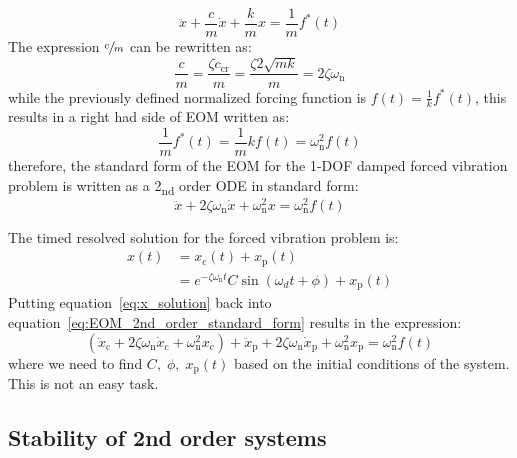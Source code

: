 \documentclass[12pt,letter]{article}
\numberwithin{ex}{section} %
\numberwithin{re}{section} %
\numberwithin{equation}{section}	%
\begin{document}
\begin{equation}
\ddot{x} + \frac{c}{m}\dot{x} + \frac{k}{m}x = \frac{1}{m}f^*(t)
\end{equation}
The expression $\sfrac{c}{m}$ can be rewritten as:
\begin{equation}
\frac{c}{m} = \frac{\zeta c_\text{cr}}{m} = \frac{\zeta 2 \sqrt{m k}}{m} = 2 \zeta \omega_\text{n}
\end{equation}
while the previously defined normalized forcing function is $f(t) = \frac{1}{k}f^*(t)$, this results in a right had side of EOM written as:
\begin{equation}
\frac{1}{m}f^*(t) = \frac{1}{m}kf(t) = \omega^2_\text{n}f(t)
\end{equation}
therefore, the standard form of the EOM for the 1-DOF damped forced vibration problem is written as a 2\textsubscript{nd} order ODE in standard form:
\begin{equation}
\ddot{x} + 2 \zeta \omega_\text{n} \dot{x} + \omega_\text{n}^2 x = \omega_\text{n}^2f(t)
\label{eq:EOM_2nd_order_standard_form}
\end{equation}

The timed resolved solution for the forced vibration problem is:
\begin{align}
\label{eq:x_solution}
x(t) &= x_\text{c}(t) + x_\text{p}(t)  \\
& = e^{-\zeta \omega_\text{n} t } C \sin (\omega_d t + \phi) + x_\text{p}(t) \nonumber
\end{align}
 Putting equation~\ref{eq:x_solution} back into equation~\ref{eq:EOM_2nd_order_standard_form} results in the expression:
\begin{equation}
(\ddot{x}_\text{c} + 2 \zeta \omega_\text{n} \dot{x}_\text{c} + \omega_\text{n}^2 x_\text{c}) + \ddot{x}_\text{p} + 2 \zeta \omega_\text{n} \dot{x}_\text{p} + \omega_\text{n}^2 x_\text{p} = \omega_\text{n}^2f(t)
\end{equation}
where we need to find $C, \; \phi, \; x_\text{p}(t)$ based on the initial conditions of the system. This is not an easy task. 



%


\subsection{Stability of 2nd order systems}
\end{document}
